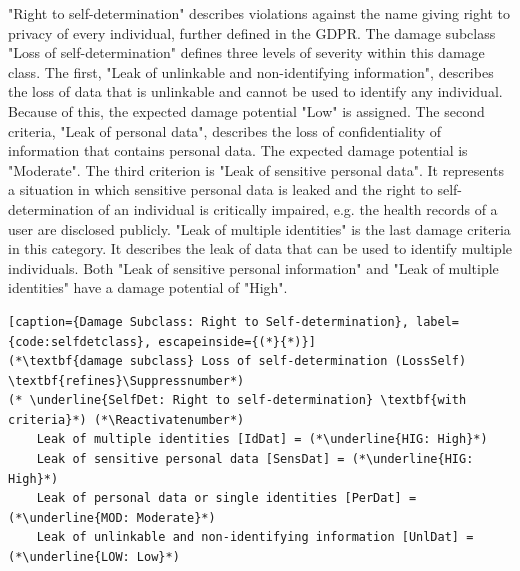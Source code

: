 "Right to self-determination" describes violations against the name giving right to privacy of every individual, further defined in the GDPR. The damage subclass "Loss of self-determination" defines three levels of severity within this damage class. The first, "Leak of unlinkable and non-identifying information", describes the loss of data that is unlinkable and cannot be used to identify any individual. Because of this, the expected damage potential "Low" is assigned. The second criteria, "Leak of personal data", describes the loss of confidentiality of information that contains personal data. The expected damage potential is "Moderate". The third criterion is "Leak of sensitive personal data". It represents a situation in which sensitive personal data is leaked and the right to self-determination of an individual is critically impaired, e.g. the health records of a user are disclosed publicly. "Leak of multiple identities" is the last damage criteria in this category. It describes the leak of data that can be used to identify multiple individuals. Both "Leak of sensitive personal information" and "Leak of multiple identities" have a damage potential of "High".\\


\begin{lstlisting}[caption={Damage Subclass: Right to Self-determination}, label={code:selfdetclass}, escapeinside={(*}{*)}]
(*\textbf{damage subclass} Loss of self-determination (LossSelf) \textbf{refines}\Suppressnumber*)
(* \underline{SelfDet: Right to self-determination} \textbf{with criteria}*) (*\Reactivatenumber*)
    Leak of multiple identities [IdDat] = (*\underline{HIG: High}*)
    Leak of sensitive personal data [SensDat] = (*\underline{HIG: High}*)
    Leak of personal data or single identities [PerDat] = (*\underline{MOD: Moderate}*)
    Leak of unlinkable and non-identifying information [UnlDat] = (*\underline{LOW: Low}*)
\end{lstlisting}



